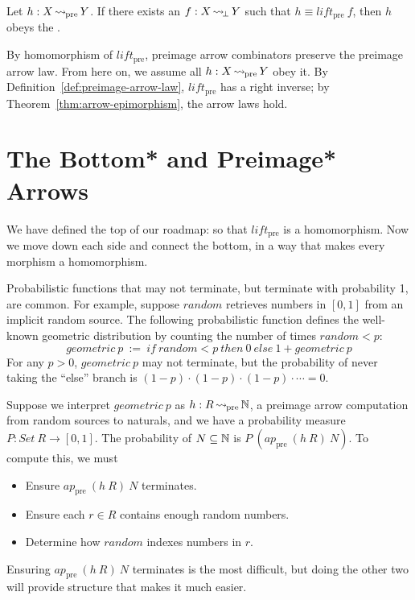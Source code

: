 \documentclass{llncs}
\newcommand{\arrow}{\rightsquigarrow}
\newcommand{\pre}{_\mathrm{pre}}
\DeclareMathOperator{\botto}{{\arrow\mspace{-3mu}}_\bot}
\DeclareMathOperator{\preto}{{\arrow\mspace{-1mu}}\pre}
\begin{document}
\begin{definition}
\label{def:preimage-arrow-law}
Let $h : X \preto Y$. If there exists an $f : X \botto Y$ such that $h \equiv lift\pre~f$, then $h$ obeys the .
\end{definition}

By homomorphism of $lift\pre$, preimage arrow combinators preserve the preimage arrow law.
From here on, we assume all $h : X \preto Y$ obey it.
By Definition~\ref{def:preimage-arrow-law}, $lift\pre$ has a right inverse; by Theorem~\ref{thm:arrow-epimorphism}, the arrow laws hold.


\section{The Bottom* and Preimage* Arrows}
\label{sec:recursive-arrows}

We have defined the top of our roadmap:
so that $lift\pre$ is a homomorphism.
Now we move down each side and connect the bottom, in a way that makes every morphism a homomorphism.


Probabilistic functions that may not terminate, but terminate with probability 1, are common.
For example, suppose $random$ retrieves numbers in $[0,1]$ from an implicit random source.
The following probabilistic function defines the well-known geometric distribution by counting the number of times $random < p$:
\begin{equation}
	geometric~p \ := \ if~random < p~then~0~else~1 + geometric~p
\label{eqn:geometric-def}
\end{equation}
For any $p > 0$, $geometric~p$ may not terminate, but the probability of never taking the ``else'' branch is $(1-p) \cdot (1-p) \cdot (1-p) \cdot \cdots = 0$.

Suppose we interpret $geometric~p$ as $h : R \preto \Nat$, a preimage arrow computation from random sources to naturals, and we have a probability measure $P : Set~R \to [0,1]$.
The probability of $N \subseteq \mathbb{N}$ is $P~(ap\pre~(h~R)~N)$.
To compute this, we must
\begin{itemize}
	\item Ensure $ap\pre~(h~R)~N$ terminates.
	\item Ensure each $r \in R$ contains enough random numbers.
	\item Determine how $random$ indexes numbers in $r$.
\end{itemize}
Ensuring $ap\pre~(h~R)~N$ terminates is the most difficult, but doing the other two will provide structure that makes it much easier.
\end{document}
